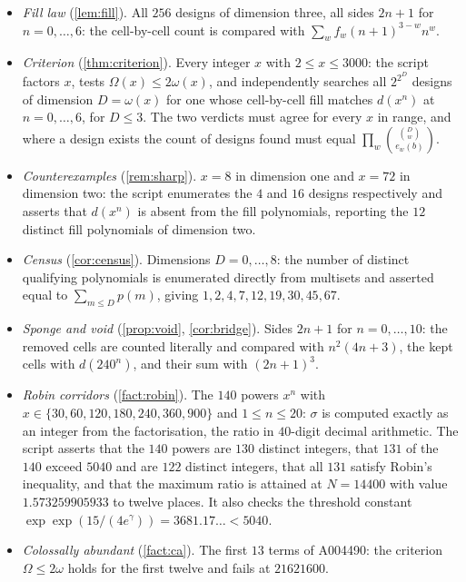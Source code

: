 \documentclass[11pt]{amsart}
\theoremstyle{definition}
\theoremstyle{remark}
\begin{document}
\begin{itemize}
\item \emph{Fill law} (\cref{lem:fill}). All $256$ designs of dimension three, all sides $2n+1$ for $n=0,\dots,6$: the cell-by-cell count is compared with $\sum_{w}f_{w}(n+1)^{3-w}n^{w}$.
\item \emph{Criterion} (\cref{thm:criterion}). Every integer $x$ with $2 \le x \le 3000$: the script factors $x$, tests $\Omega(x) \le 2\omega(x)$, and independently searches all $2^{2^{D}}$ designs of dimension $D=\omega(x)$ for one whose cell-by-cell fill matches $d(x^{n})$ at $n=0,\dots,6$, for $D \le 3$. The two verdicts must agree for every $x$ in range, and where a design exists the count of designs found must equal $\prod_{w}\binom{\binom{D}{w}}{e_{w}(b)}$.
\item \emph{Counterexamples} (\cref{rem:sharp}). $x=8$ in dimension one and $x=72$ in dimension two: the script enumerates the $4$ and $16$ designs respectively and asserts that $d(x^{n})$ is absent from the fill polynomials, reporting the $12$ distinct fill polynomials of dimension two.
\item \emph{Census} (\cref{cor:census}). Dimensions $D=0,\dots,8$: the number of distinct qualifying polynomials is enumerated directly from multisets and asserted equal to $\sum_{m \le D}p(m)$, giving $1,2,4,7,12,19,30,45,67$.
\item \emph{Sponge and void} (\cref{prop:void}, \cref{cor:bridge}). Sides $2n+1$ for $n=0,\dots,10$: the removed cells are counted literally and compared with $n^{2}(4n+3)$, the kept cells with $d(240^{n})$, and their sum with $(2n+1)^{3}$.
\item \emph{Robin corridors} (\cref{fact:robin}). The $140$ powers $x^{n}$ with $x \in \{30,\allowbreak 60,\allowbreak 120,\allowbreak 180,\allowbreak 240,\allowbreak 360,\allowbreak 900\}$ and $1 \le n \le 20$: $\sigma$ is computed exactly as an integer from the factorisation, the ratio in $40$-digit decimal arithmetic. The script asserts that the $140$ powers are $130$ distinct integers, that $131$ of the $140$ exceed $5040$ and are $122$ distinct integers, that all $131$ satisfy Robin's inequality, and that the maximum ratio is attained at $N=14400$ with value $1.573259905933$ to twelve places. It also checks the threshold constant $\exp\exp(15/(4e^{\gamma})) = 3681.17\ldots < 5040$.
\item \emph{Colossally abundant} (\cref{fact:ca}). The first $13$ terms of A004490: the criterion $\Omega \le 2\omega$ holds for the first twelve and fails at $21621600$.

\end{itemize}
\end{document}
